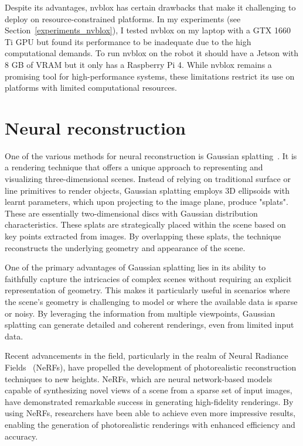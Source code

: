 Despite its advantages, nvblox has certain drawbacks that make it challenging to deploy on resource-constrained platforms. In my experiments (see Section~\ref{experiments_nvblox}), I tested nvblox on my laptop with a GTX 1660 Ti GPU but found its performance to be inadequate due to the high computational demands. To run nvblox on the robot it should have a Jetson with 8 GB of VRAM but it only has a Raspberry Pi 4. While nvblox remains a promising tool for high-performance systems, these limitations restrict its use on platforms with limited computational resources.

\section{Neural reconstruction}

One of the various methods for neural reconstruction is Gaussian splatting~\cite{3DGS}. It is a rendering technique that offers a unique approach to representing and visualizing three-dimensional scenes. Instead of relying on traditional surface or line primitives to render objects, Gaussian splatting employs 3D ellipsoids with learnt parameters, which upon projecting to the image plane, produce "splats". These are essentially two-dimensional discs with Gaussian distribution characteristics. These splats are strategically placed within the scene based on key points extracted from images. By overlapping these splats, the technique reconstructs the underlying geometry and appearance of the scene.

One of the primary advantages of Gaussian splatting lies in its ability to faithfully capture the intricacies of complex scenes without requiring an explicit representation of geometry. This makes it particularly useful in scenarios where the scene's geometry is challenging to model or where the available data is sparse or noisy. By leveraging the information from multiple viewpoints, Gaussian splatting can generate detailed and coherent renderings, even from limited input data.

Recent advancements in the field, particularly in the realm of Neural Radiance Fields~\cite{nerf} (NeRFs), have propelled the development of photorealistic reconstruction techniques to new heights. NeRFs, which are neural network-based models capable of synthesizing novel views of a scene from a sparse set of input images, have demonstrated remarkable success in generating high-fidelity renderings. By using NeRFs, researchers have been able to achieve even more impressive results, enabling the generation of photorealistic renderings with enhanced efficiency and accuracy.

